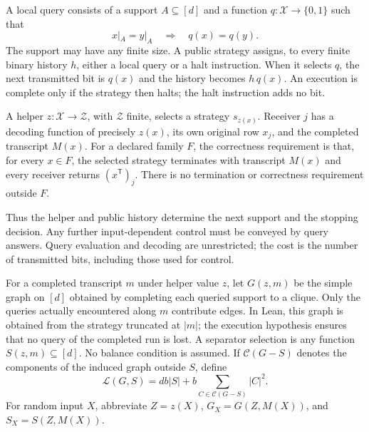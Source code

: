 \begin{definition}\label{def:local-public-strategy}
A local query consists of a support $A\subseteq[d]$ and a function
$q:\mathcal X\to\{0,1\}$ such that
\[
  x|_A=y|_A\quad\Longrightarrow\quad q(x)=q(y).
\]
The support may have any finite size.  A public strategy assigns, to every
finite binary history $h$, either a local query or a halt instruction.  When
it selects $q$, the next transmitted bit is $q(x)$ and the history becomes
$h\,q(x)$.  An execution is complete only if the strategy then halts; the
halt instruction adds no bit.

A helper $z:\mathcal X\to\mathcal Z$, with $\mathcal Z$ finite, selects a
strategy $s_{z(x)}$.  Receiver $j$ has a decoding function of precisely
$z(x)$, its own original row $x_j$, and the completed transcript $M(x)$.
For a declared family $F$, the correctness requirement is that, for every
$x\in F$, the selected strategy terminates with transcript $M(x)$ and every
receiver returns $(x^{\mathsf T})_j$.  There is no termination or correctness
requirement outside $F$.
\end{definition}

Thus the helper and public history determine the next support and the
stopping decision.  Any further input-dependent control must be conveyed by
query answers.  Query evaluation and decoding are unrestricted; the cost is
the number of transmitted bits, including those used for control.

For a completed transcript $m$ under helper value $z$, let $G(z,m)$ be the
simple graph on $[d]$ obtained by completing each queried support to a clique.
Only the queries actually encountered along $m$ contribute edges.  In Lean,
this graph is obtained from the strategy truncated at $|m|$; the execution
hypothesis ensures that no query of the completed run is lost.  A separator
selection is any function $S(z,m)\subseteq[d]$.  No balance condition is
assumed.  If $\mathcal C(G-S)$ denotes the components of the induced graph
outside $S$, define
\begin{equation}\label{eq:local-separator-loss}
  \mathcal L(G,S)=db|S|+b\sum_{C\in\mathcal C(G-S)}|C|^2.
\end{equation}
For random input $X$, abbreviate $Z=z(X)$, $G_X=G(Z,M(X))$, and
$S_X=S(Z,M(X))$.

